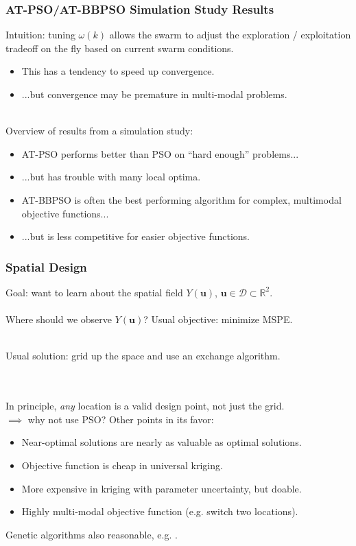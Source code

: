 \documentclass[xcolor=dvipsnames]{beamer}
\begin{document}
\begin{frame}
\frametitle{AT-PSO/AT-BBPSO Simulation Study Results}
Intuition: tuning $\omega(k)$ allows the swarm to adjust the exploration / exploitation tradeoff on the fly based on current swarm conditions.\\
\begin{itemize}
\item This has a tendency to speed up convergence.\\
\item ...but convergence may be premature in multi-modal problems.\\~\\
\end{itemize}

\pause

Overview of results from a simulation study:
\begin{itemize}
\item AT-PSO performs better than PSO on ``hard enough'' problems... 
\item ...but has trouble with many local optima.\pause
\item AT-BBPSO is often the best performing algorithm for complex, multimodal objective functions...
\item ...but is less competitive for easier objective functions.
\end{itemize}
\end{frame}

\begin{frame}
\frametitle{Spatial Design}
Goal: want to learn about the spatial field $Y(\bm{u})$, $\bm{u}\in\mathcal{D}\subset \mathbb{R}^2$. \\~\\

Where should we observe $Y(\bm{u})$? Usual objective: minimize MSPE.\pause \\~

Usual solution: grid up the space and use an exchange algorithm.\\
 \citep*{nychka1998design,wikle1999space,wikle2005dynamic} \\~\\ \pause

 In principle, \emph{any} location is a valid design point, not just the grid.\\
 $\implies$ why not use PSO? \pause Other points in its favor: \\
 \begin{itemize}
 \item Near-optimal solutions are nearly as valuable as optimal solutions.
 \item Objective function is cheap in universal kriging.
 \item More expensive in kriging with parameter uncertainty, but doable.
 \item Highly multi-modal objective function (e.g. switch two locations).\\ \pause
 \end{itemize}

 Genetic algorithms also reasonable, e.g. \citet*{hamada2001finding}.
\end{frame}
\end{document}
